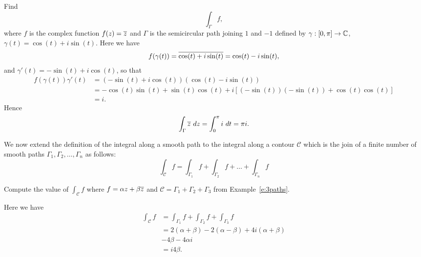 \begin{example}
 Find
\[
\int_{\Gamma} f,
\]
where $f$ is the complex function $f(z)=\overline{z}$ and $\Gamma$ is the semicircular path joining $1$ and $-1$ defined by $\gamma : [0, \pi] \to \mathbb{C}$,  $\gamma(t)=\cos(t) + i \sin (t)$.
Here we have
\[
f(\gamma(t)) = \overline{\cos(t)+i\sin(t)} = \cos(t)-i \sin(t),
\]
and $\gamma'(t) = -\sin(t)+i \cos (t)$, so that
\begin{align*}
f(\gamma(t))\gamma '(t) &=  \left(-\sin(t)+i \cos (t) \right) \left( \cos(t)-i \sin(t) \right)\\
& = -\cos(t)\sin(t)+\sin(t)\cos(t) +i \left[ (-\sin(t))(-\sin(t))+\cos(t)\cos(t) \right] \\
& = i.
\end{align*}
Hence
\[
\int_{\Gamma} \overline{z}\ dz = \int_0^{\pi} i\ dt = \pi i.
\]
\end{example}
We now extend the definition of the integral along a smooth path to the integral along a contour $\mathcal{C}$ which is the join of a finite number of smooth paths $\Gamma_1,\Gamma_2, \ldots , \Gamma_n$ as follows:
\[
\int_{\mathcal{C}} f = \int_{\Gamma_1} f + \int_{\Gamma_2} f + \ldots + \int_{\Gamma_n} f
\]
\begin{example}
\label{e:triangle}
Compute the value of $\int_{\mathcal{C}} f$ where $f=\alpha z + \beta \overline{z}$ and $\mathcal{C}=\Gamma_1 + \Gamma_2 + \Gamma_3$ from Example~\ref{e:3paths}.
\end{example}


Here we have
\begin{align*}
\int_{\mathcal{C}} f & = \int_{\Gamma_1} f + \int_{\Gamma_2} f + \int_{\Gamma_3} f \\
& = 2(\alpha+\beta)-2(\alpha-\beta)+4i(\alpha+\beta)\\
&-4\beta-4\alpha i \\
& = i 4 \beta.
\end{align*}

